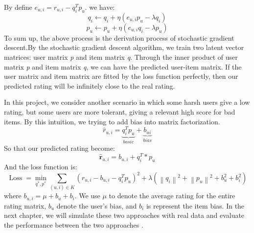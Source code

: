 By define $e_{u,i}=r_{u,i}-q_{i}^{T} p_{u}$. we have:
\begin{equation}
    q_{i} \leftarrow q_{i}+\eta\left(e_{u,i} p_{u}-\lambda q_{i}\right)
\end{equation}
\begin{equation}
    p_{u} \leftarrow p_{u}+\eta\left(e_{u,i} q_{i}-\lambda p_{u}\right)
\end{equation}
To sum up, the above process is the derivation process of stochastic gradient descent.By the stochastic gradient descent algorithm, we train two latent vector matrices: user matrix \textit{p} and item matrix \textit{q}. Through the inner product of user matrix \textit{p} and item matrix \textit{q}, we can have the predicted user-item matrix. If the user matrix and item matrix are fitted by the loss function perfectly, then our predicted rating will be infinitely close to the real rating. 

In this project, we consider another scenario in which some harsh users give a low rating, but some users are more tolerant, giving a relevant high score for bad items. By this intuition, we trying to add bias into matrix factorization.
\begin{equation}
        \hat{r}_{u,i}=\underset{basic}{\underbrace{q_{i}^{T}p_{u}}}+ \underset{bias}{\underbrace{b_{ui}}}
    \end{equation}
So that our predicted rating become:
\begin{equation}
    \hat{\boldsymbol{r}}_{u,i}=b_{u,i}+q_{i}^{T} * p_{u}
\end{equation}
And the loss function is:
\begin{equation}
    \operatorname{Loss}=\min _{q^{*}, p^{*}} \sum_{(u, i) \in K}\left(r_{u,i}-b_{u,i}-q_{i}^{T}p_{u}\right)^{2}+\lambda \left(\left\|q_{i}\right\|^{2}+\left\|p_{u}\right\|^{2}+b_{u}^{2}+b_{i}^{2}\right)
\end{equation}
where $b_{u,i} = \mu+b_{u}+b_{i}$. We use $\mu$ to denote the average rating for the entire rating matrix, $b_{u}$ denote the user's bias, and $b_{i}$ is represent the item bias.
In the next chapter, we will simulate these two approaches with real data and evaluate the performance between the two approaches .



